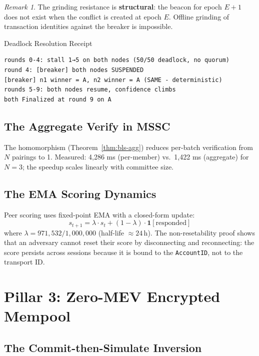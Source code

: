 \documentclass[11pt, a4paper]{article}
\theoremstyle{plain}
\theoremstyle{definition}
\theoremstyle{remark}
\newtheorem{remark}{Remark}
\begin{document}
\begin{remark}
The grinding resistance is \textbf{structural}: the beacon for epoch
 $E+1$ does not exist when the conflict is created at epoch $E$.
Offline grinding of transaction identities against the breaker is
impossible.
\end{remark}

\begin{receiptbox}{Deadlock Resolution Receipt}
\begin{verbatim}
rounds 0-4: stall 1→5 on both nodes (50/50 deadlock, no quorum)
round 4: [breaker] both nodes SUSPENDED
[breaker] n1 winner = A, n2 winner = A (SAME - deterministic)
rounds 5-9: both nodes resume, confidence climbs
both Finalized at round 9 on A
\end{verbatim}
\end{receiptbox}

\subsection{The Aggregate Verify in MSSC}

The homomorphism (Theorem~\ref{thm:bls-agg}) reduces per-batch
verification from $N$ pairings to 1. Measured: 4{,}286 ms (per-member)
vs.\ 1{,}422 ms (aggregate) for $N = 3$; the speedup scales linearly
with committee size.

\subsection{The EMA Scoring Dynamics}

Peer scoring uses fixed-point EMA with a closed-form update:
\begin{equation}
s_{t+1} = \lambda \cdot s_t + (1 - \lambda) \cdot \mathbf{1}[\text{responded}]
\end{equation}
where $\lambda = 971{,}532 / 1{,}000{,}000$ (half-life $\approx
24$\,h). The non-resetability proof shows that an adversary cannot
reset their score by disconnecting and reconnecting: the score
persists across sessions because it is bound to the
\texttt{AccountID}, not to the transport ID.

\section{Pillar 3: Zero-MEV Encrypted Mempool}
\label{sec:mev}

\subsection{The Commit-then-Simulate Inversion}
\end{document}

